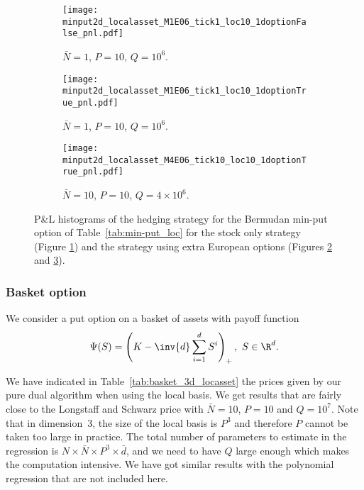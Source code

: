 \begin{figure}[h!]
  \begin{subfigure}{0.5\textwidth}
    \texttt{[image: minput2d\_localasset\_M1E06\_tick1\_loc10\_1doptionFalse\_pnl.pdf]}\caption{$\bar{N}=1$, $P=10$, $Q=10^6$.}\label{fig:min-put_loc_a}
  \end{subfigure}
  \begin{subfigure}{0.5\textwidth}
    \texttt{[image: minput2d\_localasset\_M1E06\_tick1\_loc10\_1doptionTrue\_pnl.pdf]}\caption{$\bar{N}=1$, $P=10$, $Q= 10^6$.}\label{fig:min-put_loc_b}
  \end{subfigure} 
  \begin{center}
    \begin{subfigure}{0.5\textwidth}
      \texttt{[image: minput2d\_localasset\_M4E06\_tick10\_loc10\_1doptionTrue\_pnl.pdf]}\caption{$\bar{N}=10$, $P=10$, $Q=4\times 10^6$.}\label{fig:min-put_loc_c}
  \end{subfigure}
\end{center}
  \caption{P\&L histograms of the hedging strategy for the Bermudan min-put option of Table~\ref{tab:min-put_loc}  for the stock only strategy (Figure \ref{fig:min-put_loc_a}) and the strategy using extra European options (Figures \ref{fig:min-put_loc_b} and \ref{fig:min-put_loc_c}). }\label{fig:min-put_loc}
\end{figure}


\subsubsection{Basket option}

We consider a put option on a basket of assets with payoff function
\[ \Psi(S)=\left(K - \inv{d}\sum_{i = 1}^d S^i \right)_+, \  S \in \R^d. \]

We have indicated in Table~\ref{tab:basket_3d_locasset} the prices given by our pure dual algorithm when using the local basis. We get results that are fairly close to the Longstaff and Schwarz price with $\bar{N}=10$, $P=10$ and $Q=10^7$. Note that in dimension~3, the size of the local basis is $P^3$ and therefore $P$ cannot be taken too large in practice. The total number of parameters to estimate in the regression is $N\times \bar{N} \times P^3\times \bar{d}$, and we need to have $Q$ large enough which makes the computation intensive. We have got similar results with the polynomial regression that are not included here.

